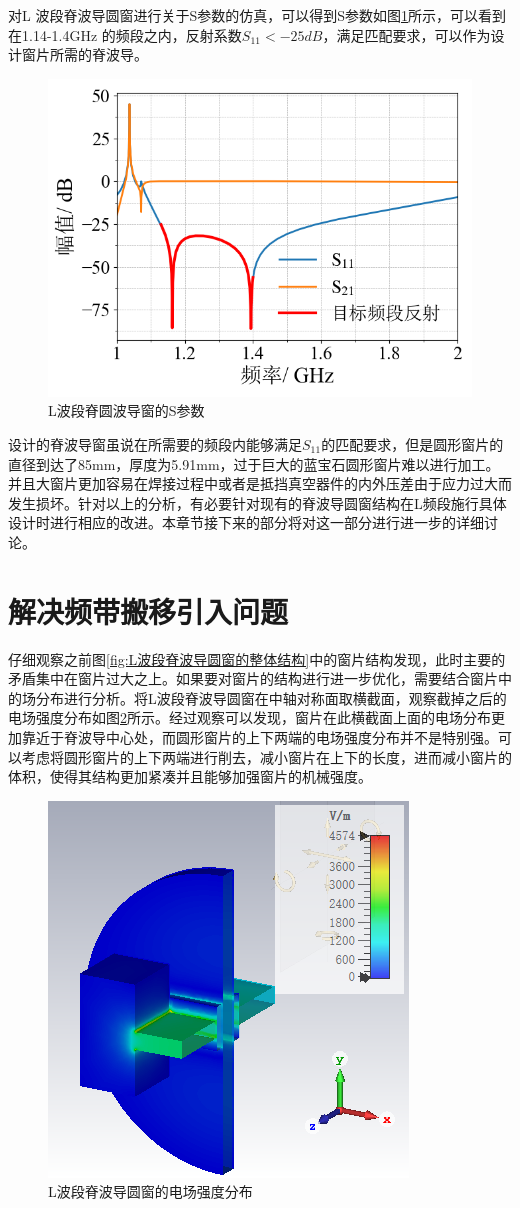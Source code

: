 \documentclass[master]{thesis-uestc}
\begin{document}
对L 波段脊波导圆窗进行关于S参数的仿真，可以得到S参数如图\ref{fig:L波段脊圆波导窗的S参数}所示，可以看到在1.14-1.4GHz 的频段之内，反射系数$S_{11}<-25dB$，满足匹配要求，可以作为设计窗片所需的脊波导。
\begin{figure}[!htb]
    \centering
    \includegraphics[width=0.5\linewidth]{pic/chapter4/L波段脊圆波导窗的S参数.png}
    \caption{L波段脊圆波导窗的S参数}
    \label{fig:L波段脊圆波导窗的S参数}
\end{figure}
设计的脊波导窗虽说在所需要的频段内能够满足$S_{11}$的匹配要求，但是圆形窗片的直径到达了85mm，厚度为5.91mm，过于巨大的蓝宝石圆形窗片难以进行加工。并且大窗片更加容易在焊接过程中或者是抵挡真空器件的内外压差由于应力过大而发生损坏。针对以上的分析，有必要针对现有的脊波导圆窗结构在L频段施行具体设计时进行相应的改进。本章节接下来的部分将对这一部分进行进一步的详细讨论。

\section{解决频带搬移引入问题}\label{sec:频带搬移时候出现的问题分析}
仔细观察之前图\ref{fig:L波段脊波导圆窗的整体结构}中的窗片结构发现，此时主要的矛盾集中在窗片过大之上。如果要对窗片的结构进行进一步优化，需要结合窗片中的场分布进行分析。将L波段脊波导圆窗在中轴对称面取横截面，观察截掉之后的电场强度分布如图\ref{fig:L波段脊波导圆窗的电场强度分布}所示。经过观察可以发现，窗片在此横截面上面的电场分布更加靠近于脊波导中心处，而圆形窗片的上下两端的电场强度分布并不是特别强。可以考虑将圆形窗片的上下两端进行削去，减小窗片在上下的长度，进而减小窗片的体积，使得其结构更加紧凑并且能够加强窗片的机械强度。
\begin{figure}[!htb]
    \centering
    \includegraphics[width=0.3\linewidth]{pic/chapter4/L波段脊波导圆窗的电场强度分布.png}
    \caption{L波段脊波导圆窗的电场强度分布}
    \label{fig:L波段脊波导圆窗的电场强度分布}
\end{figure}
\end{document}
